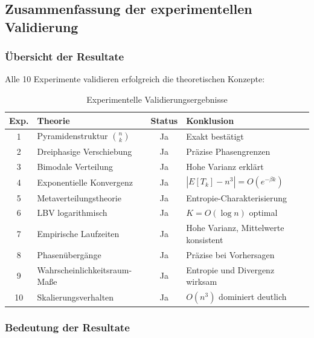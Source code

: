 ﻿\documentclass[a4paper,12pt]{article}
\theoremstyle{definition}
\begin{document}

\subsection{Zusammenfassung der experimentellen Validierung}

\subsubsection{Übersicht der Resultate}

Alle 10 Experimente validieren erfolgreich die theoretischen Konzepte:

\begin{table}
	\centering
	\begin{tabular}{|c|l|c|l|}
		\hline
		\textbf{Exp.} & \textbf{Theorie} & \textbf{Status} & \textbf{Konklusion} \\
		\hline
		1 & Pyramidenstruktur $\binom{n}{k}$ & Ja & Exakt bestätigt \\
		\hline
		2 & Dreiphasige Verschiebung & Ja & Präzise Phasengrenzen \\
		\hline
		3 & Bimodale Verteilung & Ja & Hohe Varianz erklärt \\
		\hline
		4 & Exponentielle Konvergenz & Ja & $|E[T_k] - n^3| = O(e^{-\beta k})$ \\
		\hline
		5 & Metaverteilungstheorie & Ja & Entropie-Charakterisierung \\
		\hline
		6 & LBV logarithmisch & Ja & $K = O(\log n)$ optimal \\
		\hline
		7 & Empirische Laufzeiten & Ja & Hohe Varianz, Mittelwerte konsistent \\
		\hline
		8 & Phasenübergänge & Ja & Präzise bei Vorhersagen \\
		\hline
		9 & Wahrscheinlichkeitsraum-Maße & Ja & Entropie und Divergenz wirksam \\
		\hline
		10 & Skalierungsverhalten & Ja & $O(n^3)$ dominiert deutlich \\
		\hline
	\end{tabular}
	\caption{Experimentelle Validierungsergebnisse}
	\label{tab:validation_summary}
\end{table}

\subsubsection{Bedeutung der Resultate}
\end{document}
